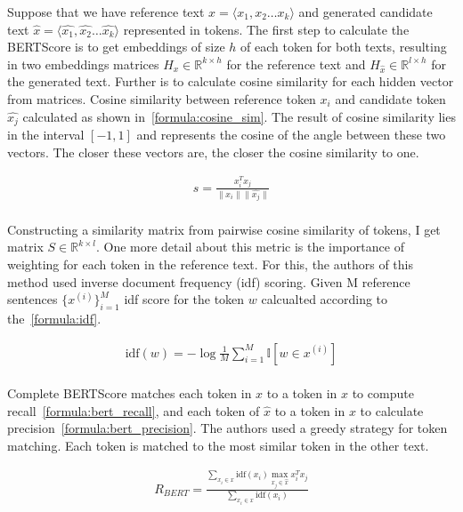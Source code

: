 Suppose that we have reference text $x = \langle x_1, x_2 \dots x_k \rangle$ and generated candidate text $\hat{x} = \langle \hat{x_1}, \hat{x_2} \dots \hat{x_k} \rangle$ represented in tokens. The first step to calculate the BERTScore is to get embeddings of size $h$ of each token for both texts, resulting in two embeddings matrices $H_x \in \mathbb{R}^{k \times h}$ for the reference text and $H_{\hat{x}} \in \mathbb{R}^{l \times h}$ for the generated text. Further is to calculate cosine similarity for each hidden vector from matrices. Cosine similarity between reference token $x_i$ and candidate token $\hat{x_j}$ calculated as shown in~\ref{formula:cosine_sim}. The result of cosine similarity lies in the interval $[-1, 1]$ and represents the cosine of the angle between these two vectors. The closer these vectors are, the closer the cosine similarity to one.

\begin{align}\label{formula:cosine_sim}
    s = \frac{x_i^T x_j}{\|x_i\| \|\hat{x_j}\|}
\end{align}\\
Constructing a similarity matrix from pairwise cosine similarity of tokens, I get matrix $S \in \mathbb{R}^{k \times l}$. One more detail about this metric is the importance of weighting for each token in the reference text. For this, the authors of this method used inverse document frequency (idf) scoring. Given M reference sentences $\{ x^{(i)} \}_{i=1}^M$ idf score for the token $w$ calcualted according to the~\ref{formula:idf}. 

\begin{align}\label{formula:idf}
    \text{idf}(w) = -\log \frac{1}{M} \sum_{i=1}^{M} \mathbb{I}\left[ w \in x^{(i)} \right]
\end{align}\\
Complete BERTScore matches each token in $x$ to a token in $\hat{x}$ to compute recall~\ref{formula:bert_recall}, and each token of $\hat{x}$ to a token in $x$ to calculate precision~\ref{formula:bert_precision}. The authors used a greedy strategy for token matching. Each token is matched to the most similar token in the other text. 

\begin{align}\label{formula:bert_recall}
    R_{BERT} = \frac{\sum_{x_i \in x } \text{idf}(x_i) \max_{x_j \in \hat{x}} x_i^T x_j}{\sum_{x_i \in x} \text{idf}(x_i)}
\end{align}

